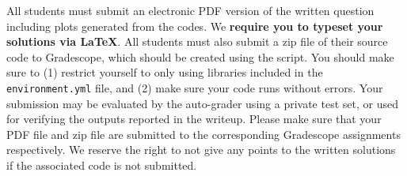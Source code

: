 All students must submit an electronic PDF version of the written question including plots generated from the codes. We
{\bf require you to typeset your solutions via \LaTeX}. 
All students must also submit a zip file of
their source code to Gradescope, which should be created using the
 script. You
should make sure to (1) restrict yourself to only using libraries included in
the
\texttt{environment.yml} file, and (2) make sure your code runs without errors.
Your submission may be evaluated by the
auto-grader using a private test set, or used for verifying the outputs reported in the writeup. Please make sure that your PDF file and zip file are submitted to the corresponding Gradescope assignments respectively. We reserve the right to not give any points to the written solutions if the associated code is not submitted.

\vspace{0.1in}
